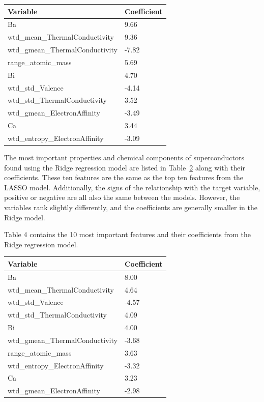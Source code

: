 \documentclass{article}      %
\begin{document}
\begin{table}[h!]
    \centering
    \begin{tabular}{|l|l|}
    \hline
    \textbf{Variable} & \textbf{Coefficient} \\ \hline \hline
    Ba & 9.66 \\ \hline
    wtd\_mean\_ThermalConductivity & 9.36 \\ \hline
    wtd\_gmean\_ThermalConductivity & -7.82 \\ \hline
    range\_atomic\_mass & 5.69 \\ \hline
    Bi & 4.70 \\ \hline
    wtd\_std\_Valence & -4.14 \\ \hline
    wtd\_std\_ThermalConductivity & 3.52 \\ \hline
    wtd\_gmean\_ElectronAffinity & -3.49 \\ \hline
    Ca & 3.44 \\ \hline
    wtd\_entropy\_ElectronAffinity & -3.09 \\ \hline
    \end{tabular}
    \label{table:lasso_coefficients}
\end{table}

The most important properties and chemical components of superconductors found using the Ridge regression model are listed in Table~\ref{table:ridge_coefficients} along with their coefficients. These ten features are the same as the top ten features from the LASSO model. Additionally, the signs of the relationship with the target variable, positive or negative are all also the same between the models. However, the variables rank slightly differently, and the coefficients are generally smaller in the Ridge model.

Table 4 contains the 10 most important features and their coefficients from the Ridge regression model.

\begin{table}[h!]
    \centering
    \begin{tabular}{|l|l|}
    \hline
    \textbf{Variable} & \textbf{Coefficient} \\ \hline \hline
    Ba & 8.00 \\ \hline
    wtd\_mean\_ThermalConductivity & 4.64 \\ \hline
    wtd\_std\_Valence & -4.57 \\ \hline
    wtd\_std\_ThermalConductivity & 4.09 \\ \hline
    Bi & 4.00 \\ \hline
    wtd\_gmean\_ThermalConductivity & -3.68 \\ \hline
    range\_atomic\_mass & 3.63 \\ \hline
    wtd\_entropy\_ElectronAffinity & -3.32 \\ \hline
    Ca & 3.23 \\ \hline
    wtd\_gmean\_ElectronAffinity & -2.98 \\ \hline
    \end{tabular}
    \label{table:ridge_coefficients}
\end{table}
\end{document}
